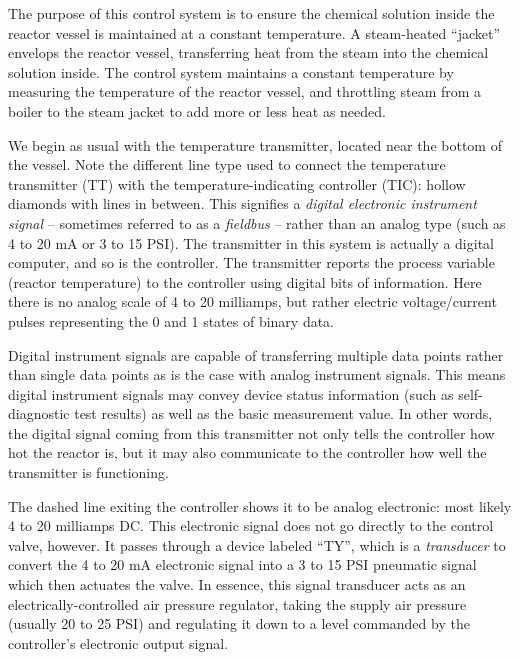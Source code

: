 The purpose of this control system is to ensure the chemical solution inside the reactor vessel is maintained at a constant temperature.  A steam-heated ``jacket'' envelops the reactor vessel, transferring heat from the steam into the chemical solution inside.  The control system maintains a constant temperature by measuring the temperature of the reactor vessel, and throttling steam from a boiler to the steam jacket to add more or less heat as needed.   

We begin as usual with the temperature transmitter, located near the bottom of the vessel.  Note the different line type used to connect the temperature transmitter (TT) with the temperature-indicating controller (TIC): hollow diamonds with lines in between.  This signifies a \textit{digital electronic instrument signal} -- sometimes referred to as a \textit{fieldbus} -- rather than an analog type (such as 4 to 20 mA or 3 to 15 PSI).  The transmitter in this system is actually a digital computer, and so is the controller.  The transmitter reports the process variable (reactor temperature) to the controller using digital bits of information.  Here there is no analog scale of 4 to 20 milliamps, but rather electric voltage/current pulses representing the 0 and 1 states of binary data. 

Digital instrument signals are capable of transferring multiple data points rather than single data points as is the case with analog instrument signals.  This means digital instrument signals may convey device status information (such as self-diagnostic test results) as well as the basic measurement value.  In other words, the digital signal coming from this transmitter not only tells the controller how hot the reactor is, but it may also communicate to the controller how well the transmitter is functioning.

The dashed line exiting the controller shows it to be analog electronic: most likely 4 to 20 milliamps DC.  This electronic signal does not go directly to the control valve, however.  It passes through a device labeled ``TY'', which is a \textit{transducer} to convert the 4 to 20 mA electronic signal into a 3 to 15 PSI pneumatic signal which then actuates the valve.  In essence, this signal transducer acts as an electrically-controlled air pressure regulator, taking the supply air pressure (usually 20 to 25 PSI) and regulating it down to a level commanded by the controller's electronic output signal.

